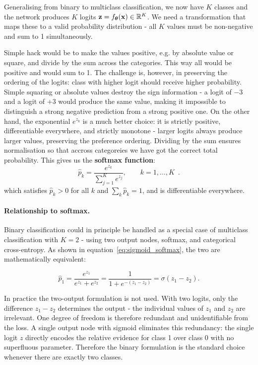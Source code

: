Generalising from binary to multiclass classification, we now have $K$ classes and the network produces $K$ logits $\mathbf{z} = f_{\boldsymbol{\theta}}(\mathbf{x}) \in \mathbb{R}^K$. We need a transformation that maps these to a valid probability distribution - all $K$ values must be non-negative and sum to 1 simultaneously.

Simple hack would be to make the values positive, e.g. by absolute value or square, and divide by the sum across the categories. This way all would be positive and would sum to 1. The challenge is, however, in preserving the ordering of the logits: class with higher logit should receive higher probability. Simple squaring or absolute values destroy the sign information - a logit of $-3$ and a logit of $+3$ would produce the same value, making it impossible to distinguish a strong negative prediction from a strong positive one. On the other hand, the exponential $e^{z_k}$ is a much better choice: it is strictly positive, differentiable everywhere, and strictly monotone - larger logits always produce larger values, preserving the preference ordering. Dividing by the sum ensures normalisation so that accross categoreies we have got the correct total probability. This gives us the \textbf{softmax function}:
\begin{equation}
    \hat{p}_k = \frac{e^{z_k}}{\sum_{j=1}^{K} e^{z_j}}, \qquad k = 1, \ldots, K \enspace.
\end{equation}
which satisfies $\hat{p}_k > 0$ for all $k$ and $\sum_k \hat{p}_k = 1$, and is differentiable everywhere. 


\paragraph{Relationship to softmax.}
Binary classification could in principle be handled as a special case of multiclass classification with $K=2$ - using two output nodes, softmax, and categorical cross-entropy. As shown in equation~\eqref{eq:sigmoid_softmax}, the two are mathematically equivalent:

\begin{equation}\label{eq:sigmoid_softmax}
    \hat{p}_1 = \frac{e^{z_1}}{e^{z_1} + e^{z_2}} = \frac{1}{1 + e^{-(z_1-z_2)}} = \sigma(z_1 - z_2).
\end{equation}

In practice the two-output formulation is not used. With two logits, only the difference $z_1 - z_2$ determines the output - the individual values of $z_1$ and $z_2$ are irrelevant. One degree of freedom is therefore redundant and unidentifiable from the loss. A single output node with sigmoid eliminates this redundancy: the single logit $z$ directly encodes the relative evidence for class 1 over class 0 with no superfluous parameter. Therefore the binary formulation is the standard choice whenever there are exactly two classes.


